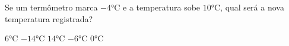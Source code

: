 Se um termômetro marca $-4$°C e a temperatura sobe $10$°C, qual será a nova temperatura registrada?

$6$°C
$-14$°C
$14$°C
$-6$°C
$0$°C




